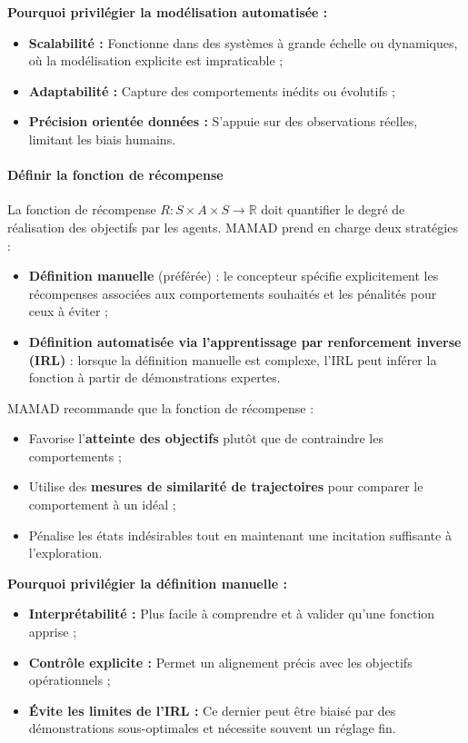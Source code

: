 \vspace{0.4em}
\noindent \textbf{Pourquoi privilégier la modélisation automatisée :}
\begin{itemize}
    \item \textbf{Scalabilité :} Fonctionne dans des systèmes à grande échelle ou dynamiques, où la modélisation explicite est impraticable ;
    \item \textbf{Adaptabilité :} Capture des comportements inédits ou évolutifs ;
    \item \textbf{Précision orientée données :} S'appuie sur des observations réelles, limitant les biais humains.
\end{itemize}

\paragraph{Définir la fonction de récompense}

La fonction de récompense $R: S \times A \times S \to \mathbb{R}$ doit quantifier le degré de réalisation des objectifs par les agents. MAMAD prend en charge deux stratégies :

\begin{itemize}
    \item \textbf{Définition manuelle} (préférée) : le concepteur spécifie explicitement les récompenses associées aux comportements souhaités et les pénalités pour ceux à éviter ;
    \item \textbf{Définition automatisée via l'apprentissage par renforcement inverse (IRL)} : lorsque la définition manuelle est complexe, l'IRL peut inférer la fonction à partir de démonstrations expertes.
\end{itemize}

MAMAD recommande que la fonction de récompense :
\begin{itemize}
    \item Favorise l'\textbf{atteinte des objectifs} plutôt que de contraindre les comportements ;
    \item Utilise des \textbf{mesures de similarité de trajectoires} pour comparer le comportement à un idéal ;
    \item Pénalise les états indésirables tout en maintenant une incitation suffisante à l'exploration.
\end{itemize}

\vspace{0.4em}
\noindent \textbf{Pourquoi privilégier la définition manuelle :}
\begin{itemize}
    \item \textbf{Interprétabilité :} Plus facile à comprendre et à valider qu'une fonction apprise ;
    \item \textbf{Contrôle explicite :} Permet un alignement précis avec les objectifs opérationnels ;
    \item \textbf{Évite les limites de l'IRL :} Ce dernier peut être biaisé par des démonstrations sous-optimales et nécessite souvent un réglage fin.
\end{itemize}

